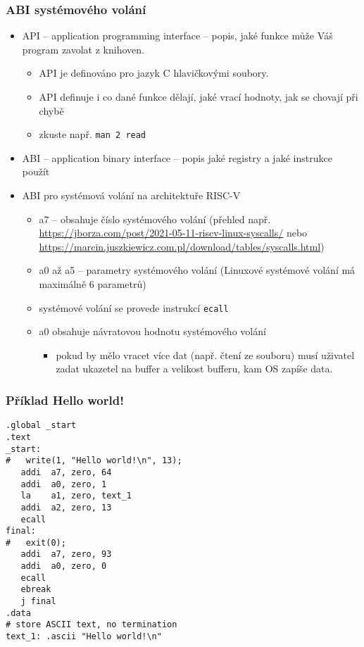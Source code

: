 \documentclass{beamer}
\begin{document}
\begin{frame}[shrink=5]
\frametitle{ABI systémového volání}

\begin{itemize}
\item API -- application programming interface -- popis, jaké funkce může Váš program zavolat z knihoven.
\begin{itemize}
\item API je definováno pro jazyk C hlavičkovými soubory.
\item API definuje i co dané funkce dělají, jaké vrací hodnoty, jak se chovají při chybě
\item zkuste např. \texttt{man 2 read}
\end{itemize}
\item ABI -- application binary interface -- popis jaké registry a jaké instrukce použít
\item ABI pro systémová volání na architektuře RISC-V
\begin{itemize}
\item a7 -- obsahuje číslo systémového volání (přehled např. \url{https://jborza.com/post/2021-05-11-riscv-linux-syscalls/} nebo \url{https://marcin.juszkiewicz.com.pl/download/tables/syscalls.html})
\item a0 až a5 -- parametry systémového volání (Linuxové systémové volání má maximálně 6 parametrů)
\item systémové volání se provede instrukcí \texttt{ecall}
\item a0 obsahuje návratovou hodnotu systémového volání
\begin{itemize}
\item pokud by mělo vracet více dat (např. čtení ze souboru) musí uživatel zadat ukazetel na buffer a velikost bufferu, kam OS zapíše data.
\end{itemize}
\end{itemize}
\end{itemize}

\end{frame}

\begin{frame}[fragile]
\frametitle{Příklad Hello world!}


\begin{verbatim}
.global _start
.text
_start:
#   write(1, "Hello world!\n", 13);
   addi  a7, zero, 64
   addi  a0, zero, 1
   la    a1, zero, text_1
   addi  a2, zero, 13
   ecall
final:
#   exit(0);
   addi  a7, zero, 93
   addi  a0, zero, 0
   ecall
   ebreak
   j final
.data
# store ASCII text, no termination
text_1: .ascii "Hello world!\n"
\end{verbatim}
\end{frame}
\end{document}
